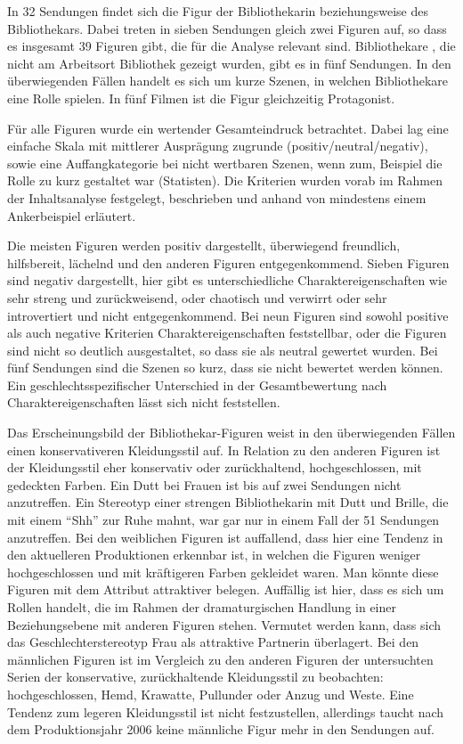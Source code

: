 In 32 Sendungen findet sich die Figur der Bibliothekarin beziehungsweise
des Bibliothekars. Dabei treten in sieben Sendungen gleich zwei Figuren
auf, so dass es insgesamt 39 Figuren gibt, die für die Analyse relevant
sind. Bibliothekare , die nicht am Arbeitsort Bibliothek gezeigt wurden,
gibt es in fünf Sendungen. In den überwiegenden Fällen handelt es sich
um kurze Szenen, in welchen Bibliothekare eine Rolle spielen. In fünf
Filmen ist die Figur gleichzeitig Protagonist.

Für alle Figuren wurde ein wertender Gesamteindruck betrachtet. Dabei
lag eine einfache Skala mit mittlerer Ausprägung zugrunde
(positiv/neutral/negativ), sowie eine Auffangkategorie bei nicht
wertbaren Szenen, wenn zum, Beispiel die Rolle zu kurz gestaltet war
(Statisten). Die Kriterien wurden vorab im Rahmen der Inhaltsanalyse
festgelegt, beschrieben und anhand von mindestens einem Ankerbeispiel
erläutert.

Die meisten Figuren werden positiv dargestellt, überwiegend freundlich,
hilfsbereit, lächelnd und den anderen Figuren entgegenkommend. Sieben
Figuren sind negativ dargestellt, hier gibt es unterschiedliche
Charaktereigenschaften wie sehr streng und zurückweisend, oder chaotisch
und verwirrt oder sehr introvertiert und nicht entgegenkommend. Bei neun
Figuren sind sowohl positive als auch negative Kriterien
Charaktereigenschaften feststellbar, oder die Figuren sind nicht so
deutlich ausgestaltet, so dass sie als neutral gewertet wurden. Bei fünf
Sendungen sind die Szenen so kurz, dass sie nicht bewertet werden
können. Ein geschlechtsspezifischer Unterschied in der Gesamtbewertung
nach Charaktereigenschaften lässt sich nicht feststellen.

Das Erscheinungsbild der Bibliothekar-Figuren weist in den überwiegenden
Fällen einen konservativeren Kleidungsstil auf. In Relation zu den
anderen Figuren ist der Kleidungsstil eher konservativ oder
zurückhaltend, hochgeschlossen, mit gedeckten Farben. Ein Dutt bei
Frauen ist bis auf zwei Sendungen nicht anzutreffen. Ein Stereotyp einer
strengen Bibliothekarin mit Dutt und Brille, die mit einem \enquote{Shh}
zur Ruhe mahnt, war gar nur in einem Fall der 51 Sendungen anzutreffen.
Bei den weiblichen Figuren ist auffallend, dass hier eine Tendenz in den
aktuelleren Produktionen erkennbar ist, in welchen die Figuren weniger
hochgeschlossen und mit kräftigeren Farben gekleidet waren. Man könnte
diese Figuren mit dem Attribut attraktiver belegen. Auffällig
ist hier, dass es sich um Rollen handelt, die im Rahmen der
dramaturgischen Handlung in einer Beziehungsebene mit anderen Figuren
stehen. Vermutet werden kann, dass sich das
Geschlechterstereotyp Frau als attraktive Partnerin
überlagert. Bei den männlichen Figuren ist im Vergleich zu den anderen
Figuren der untersuchten Serien der konservative, zurückhaltende
Kleidungsstil zu beobachten: hochgeschlossen, Hemd, Krawatte, Pullunder
oder Anzug und Weste. Eine Tendenz zum legeren Kleidungsstil ist nicht
festzustellen, allerdings taucht nach dem Produktionsjahr 2006 keine
männliche Figur mehr in den Sendungen auf.

